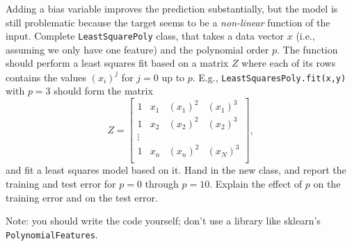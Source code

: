 \documentclass{article}
\def\blu#1{{\color{blu}#1}}
\begin{document}
Adding a bias variable improves the prediction substantially, but the model is still problematic because the target seems to be a \emph{non-linear} function of the input.
Complete \texttt{LeastSquarePoly} class, that takes a data vector $x$ (i.e., assuming we only have one feature) and the polynomial order $p$. The function should perform a least squares fit based on a matrix $Z$ where each of its rows contains the values $(x_{i})^j$ for $j=0$ up to $p$. E.g., \texttt{LeastSquaresPoly.fit(x,y)}  with $p = 3$ should form the matrix
\[
Z =
\left[\begin{array}{cccc}
1 & x_1 & (x_1)^2 & (x_1)^3\\
1 & x_2 & (x_2)^2 & (x_2)^3\\
\vdots\\
1 & x_n & (x_n)^2 & (x_N)^3\\
\end{array}
\right],
\]
and fit a least squares model based on it.
\blu{Hand in the new class, and report the training and test error for $p = 0$ through $p= 10$. Explain the effect of $p$ on the training error and on the test error.}

Note: you should write the code yourself; don't use a library like sklearn's \texttt{PolynomialFeatures}.
\end{document}
